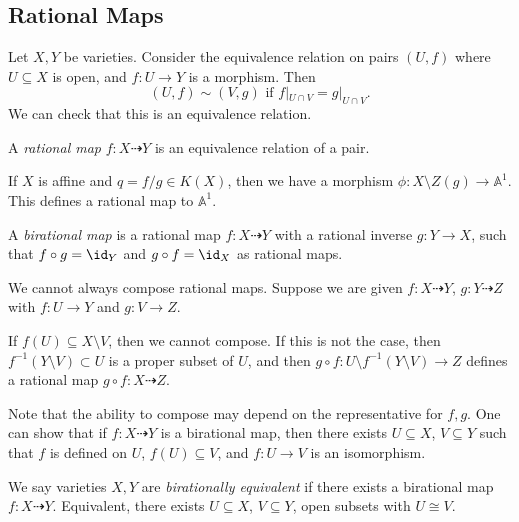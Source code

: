 \documentclass[12pt]{article}
\begin{document}
\subsection{Rational Maps}
\label{sub:rat_map}

Let $X, Y$ be varieties. Consider the equivalence relation on pairs $(U, f)$ where $U \subseteq X$ is open, and $f : U \to Y$ is a morphism. Then
\[
	(U, f) \sim (V, g) \text{ if } f|_{U \cap V} = g|_{U \cap V}.
\]
We can check that this is an equivalence relation.

\begin{definition}
	A \emph{rational map} $f : X \dashrightarrow Y$ is an equivalence relation of a pair.
\end{definition}

\begin{exbox}
	If $X$ is affine and $q = f/g \in K(X)$, then we have a morphism $\phi : X \setminus Z(g) \to \mathbb{A}^1$. This defines a rational map to $\mathbb{A}^1$.
\end{exbox}


\begin{definition}
	A \emph{birational map} is a rational map $f : X \dashrightarrow Y$ with a rational inverse $g : Y \to X$, such that $f \circ g = \id_Y$ and $g \circ f = \id_X$ as rational maps.
\end{definition}

\begin{remark}
	We cannot always compose rational maps. Suppose we are given $f : X \dashrightarrow Y$, $g : Y \dashrightarrow Z$ with $f : U \to Y$ and $g : V \to Z$.

	If $f(U) \subseteq X \setminus V$, then we cannot compose. If this is not the case, then $f^{-1}(Y \setminus V) \subset U$ is a proper subset of $U$, and then $g \circ f : U \setminus f^{-1}(Y \setminus V) \to Z$ defines a rational map $g \circ f : X \dashrightarrow Z$.
\end{remark}

Note that the ability to compose may depend on the representative for $f, g$. One can show that if $f : X \dashrightarrow Y$ is a birational map, then there exists $U \subseteq X$, $V \subseteq Y$ such that $f$ is defined on $U$, $f(U) \subseteq V$, and $f : U \to V$ is an isomorphism.

\begin{definition}
	We say varieties $X, Y$ are \emph{birationally equivalent} if there exists a birational map $f : X \dashrightarrow Y$. Equivalent, there exists $U \subseteq X$, $V \subseteq Y$, open subsets with $U \cong V$.
\end{definition}
\end{document}
